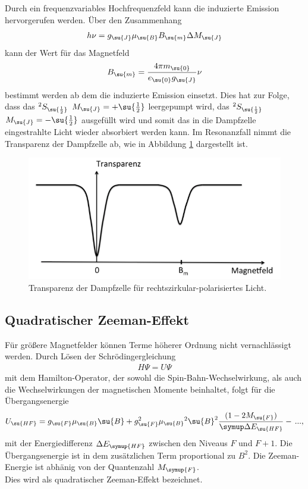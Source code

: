\noindent Durch ein frequenzvariables Hochfrequenzfeld kann die induzierte Emission hervorgerufen werden.
Über den Zusammenhang
\begin{align*}
    h\nu = g_{\su{J}} \mu_{\su{B}} B_{\su{m}} \Delta M_{\su{J}}
\end{align*}
kann der Wert für das Magnetfeld
\begin{align*}
    B_{\su{m}} = \frac{4\pi m_{\su{0}}} {e_{\su{0}} g_{\su{J}}} \nu
\end{align*}
bestimmt werden ab dem die induzierte Emission einsetzt. Dies hat zur Folge, dass das
$^{2}S_{\su{\frac{1}{2}}}$ $M_{\su{J}}=+\su{\frac{1}{2}}$ leergepumpt wird, das
$^{2}S_{\su{\frac{1}{2}}}$ $M_{\su{J}}=-\su{\frac{1}{2}}$ ausgefüllt wird und somit
das in die Dampfzelle eingestrahlte Licht wieder absorbiert werden kann.
Im Resonanzfall nimmt die Transparenz der Dampfzelle ab, wie in Abbildung \ref{fig:resonanz}
dargestellt ist.
\begin{figure}
    \centering
    \includegraphics[scale = 0.6]{pictures/resonanz.png}
    \caption{Transparenz der Dampfzelle für rechtszirkular-polarisiertes Licht.\cite{1}}
    \label{fig:resonanz}
\end{figure}

\subsection{Quadratischer Zeeman-Effekt}
Für größere Magnetfelder können Terme höherer Ordnung nicht vernachlässigt werden.
Durch Lösen der Schrödingergleichung
\begin{align*}
    H \Psi = U \Psi
\end{align*}
mit dem Hamilton-Operator, der sowohl die Spin-Bahn-Wechselwirkung, als auch die Wechselwirkungen
der magnetischen Momente beinhaltet, folgt für die Übergangsenergie
\begin{align*}
     U_{\su{HF}} = g_{\su{F}} \mu{_\su{B}} \su{B} + g_{\su{F}}^2 \mu{_\su{B}}^2 \su{B}^2 \frac{(1-2M_{\su{F}})}{\symup\Delta E_{\su{HF}}} -\,...,
\end{align*}
mit der Energiedifferenz $\Delta E_{\symup{HF}}$ zwischen den Niveaus $F$ und $F+1$. Die Übergangsenergie ist in dem
zusätzlichen Term proportional zu $B^2$. Die Zeeman-Energie ist abhänig von der Quantenzahl $M_{\symup{F}}$.\\
Dies wird als quadratischer Zeeman-Effekt bezeichnet.

